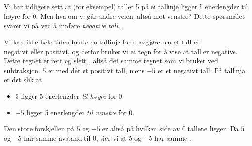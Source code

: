





\section{\negintro}
Vi har tidligere sett at (for eksempel) tallet 5 på ei tallinje ligger 5 enerlengder til høyre for 0. 
Men hva om vi går andre veien, altså mot venstre? Dette spørsmålet svarer vi på ved å innføre \textit{negative tall}. .\regv

\vsk 
Vi kan ikke hele tiden bruke en tallinje for å avgjøre om et tall er\\ negativt eller positivt, og derfor bruker vi et tegn for å vise at tall er negative. Dette tegnet er rett og slett \sym{$ - $}, altså det samme tegnet som vi bruker ved subtraksjon. $ 5 $ er med dét et positivt tall, mens $ -5 $ er et negativt tall. På tallinja er det slik at
\begin{itemize}
	\item 5 ligger 5 enerlengder \textsl{til høyre} for 0.
	\item $ -5 $ ligger 5 enerlengder \textsl{til venstre} for 0.
\end{itemize}
Den store forskjellen på $ 5 $ og $ -5 $ er altså på hvilken side av 0 tallene ligger. Da $ 5 $ og $ -5 $ har samme avstand til 0, sier vi at $ 5 $ og $ -5 $ har samme . \regv

\eks[1]{ \vs \vs
\[ |27|=27 \]
}
\eks[2]{ \vs \vs
\[\left|-27\right|=27 \]
}
\newpage
